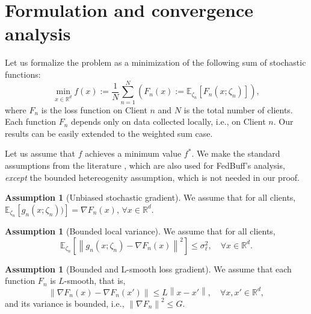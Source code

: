 \documentclass[nohyperref]{article}
\theoremstyle{plain}
\theoremstyle{definition}
\newtheorem{assumption}[theorem]{Assumption}
\theoremstyle{remark}
\newcommand{\norm}[1]{\left\lVert#1\right\rVert}
\begin{document}
\section{Formulation and convergence analysis}
\label{sec:formulation}
Let us formalize the problem as a minimization of the following sum of stochastic functions:
\begin{equation} \label{eq:minimization_problem}
    \min_{x \in \mathbb{R}^d} f(x) := \frac{1}{N} \sum_{n=1}^N \left( F_n(x) :=  \mathbb{E}_{\zeta_n}[F_n(x;\zeta_n)] \right),
\end{equation}
where $F_n$ is the loss function on Client $n$ and $N$ is the total number of clients.
Each function $F_n$ depends only on data collected locally, i.e., on Client $n$.
Our results can be easily extended to the weighted sum case.


Let us assume that $f$ achieves a minimum value $f^*$.
We make the standard assumptions from the literature \cite{adaptive-fl-optimization, fedavg_conv_Li, stich2018local, Yu-speedup, SCAFFOLD}, which are also used for FedBuff's analysis, \emph{except} the bounded hetereogenity assumption, which is not needed in our proof.
\begin{assumption}[Unbiased stochastic gradient]
    \label{ass:unbiased-stochastic-gradient}
    We assume that for all clients, $\mathbb{E}_{\zeta_n}[g_n(x; \zeta_n))] = \nabla F_n(x)$, $\forall x \in \mathbb{R}^d$.
\end{assumption}
\begin{assumption}[Bounded local variance]
    \label{ass:bounded-local-variance}
    We assume that for all clients, $$\mathbb{E}_{\zeta_n}[\norm{g_n(x; \zeta_n) - \nabla F_n(x)}^2] \leq \sigma^2_{\ell}, \quad \forall x \in \mathbb{R}^d.$$
\end{assumption}
\begin{assumption}[Bounded and L-smooth loss gradient]
    \label{ass:bounded-and-l-smooth-loss-gradient}
    We assume that each function $F_n$ is $L$-smooth, that is,
    $$\norm{\nabla F_n(x) - \nabla F_n(x')} \leq L \norm{x - x'}, \quad \forall x,x'\in \mathbb{R}^d,$$
    and its variance is bounded, i.e., $\norm{\nabla F_n}^2 \leq G$.
\end{assumption}
\end{document}
